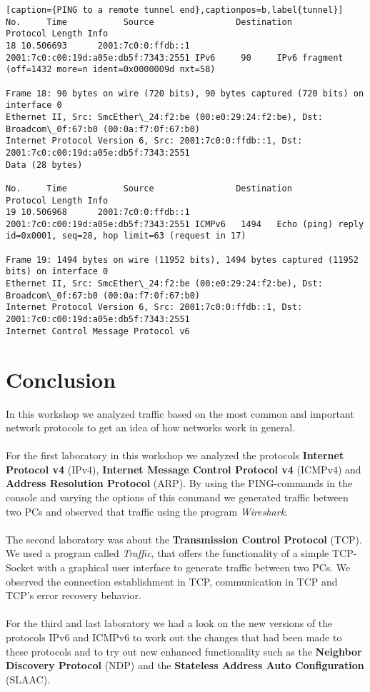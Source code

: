 \begin{lstlisting}[caption={PING to a remote tunnel end},captionpos=b,label{tunnel}]
No.     Time           Source                Destination           Protocol Length Info
18 10.506693      2001:7c0:0:ffdb::1    2001:7c0:c00:19d:a05e:db5f:7343:2551 IPv6     90     IPv6 fragment (off=1432 more=n ident=0x0000009d nxt=58)

Frame 18: 90 bytes on wire (720 bits), 90 bytes captured (720 bits) on interface 0
Ethernet II, Src: SmcEther\_24:f2:be (00:e0:29:24:f2:be), Dst: Broadcom\_0f:67:b0 (00:0a:f7:0f:67:b0)
Internet Protocol Version 6, Src: 2001:7c0:0:ffdb::1, Dst: 2001:7c0:c00:19d:a05e:db5f:7343:2551
Data (28 bytes)

No.     Time           Source                Destination           Protocol Length Info
19 10.506968      2001:7c0:0:ffdb::1    2001:7c0:c00:19d:a05e:db5f:7343:2551 ICMPv6   1494   Echo (ping) reply id=0x0001, seq=28, hop limit=63 (request in 17)

Frame 19: 1494 bytes on wire (11952 bits), 1494 bytes captured (11952 bits) on interface 0
Ethernet II, Src: SmcEther\_24:f2:be (00:e0:29:24:f2:be), Dst: Broadcom\_0f:67:b0 (00:0a:f7:0f:67:b0)
Internet Protocol Version 6, Src: 2001:7c0:0:ffdb::1, Dst: 2001:7c0:c00:19d:a05e:db5f:7343:2551
Internet Control Message Protocol v6

\end{lstlisting}
\chapter{Conclusion}
\label{conclusion}
In this workshop we analyzed traffic based on the most common and important network protocols to get an idea of how networks work in general.
\\\\
For the first laboratory in this workshop we analyzed the protocols \textbf{Internet Protocol v4} (IPv4), \textbf{Internet Message Control Protocol v4} (ICMPv4) and \textbf{Address Resolution Protocol} (ARP). By using the PING-commands in the console and varying the options of this command we generated traffic between two PCs and observed that traffic using the program \textit{Wireshark}.
\\\\
The second laboratory was about the \textbf{Transmission Control Protocol} (TCP). We used a program called \textit{Traffic}, that offers the functionality of a simple TCP-Socket with a graphical user interface to generate traffic between two PCs. We observed the connection establishment in TCP, communication in TCP and TCP's error recovery behavior.
\\\\
For the third and last laboratory we had a look on the new versions of the protocols IPv6 and ICMPv6 to work out the changes that had been made to these protocols and to try out new enhanced functionality such as the \textbf{Neighbor Discovery Protocol} (NDP) and the \textbf{Stateless Address Auto Configuration} (SLAAC).
